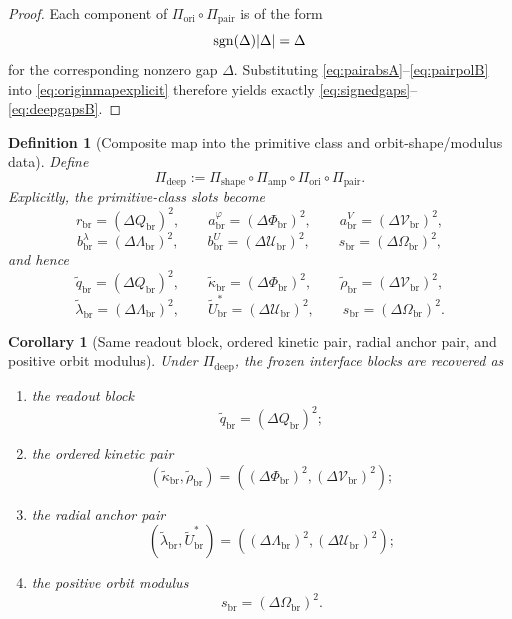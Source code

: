 \documentclass[11pt]{article}
\newcommand{\RespShapeReadout}{\widetilde q_{\mathrm{br}}}
\newcommand{\RespShapeCov}{\widetilde\kappa_{\mathrm{br}}}
\newcommand{\RespShapeRelax}{\widetilde\rho_{\mathrm{br}}}
\newcommand{\RespShapeWell}{\widetilde\lambda_{\mathrm{br}}}
\newcommand{\RespShapeEq}{\widetilde U_{\mathrm{br}}^{\ast}}
\newcommand{\ScaleMod}{s_{\mathrm{br}}}
\newcommand{\PrimRead}{r_{\mathrm{br}}}
\newcommand{\PrimCovSlot}{a_{\mathrm{br}}^{\varphi}}
\newcommand{\PrimRelaxSlot}{a_{\mathrm{br}}^{V}}
\newcommand{\PrimWellSlot}{b_{\mathrm{br}}^{\lambda}}
\newcommand{\PrimEqSlot}{b_{\mathrm{br}}^{U}}
\newcommand{\AmpMap}{\Pi_{\mathrm{amp}}}
\newcommand{\PrimMap}{\Pi_{\mathrm{shape}}}
\newcommand{\OriginMap}{\Pi_{\mathrm{ori}}}
\newcommand{\DeepMap}{\Pi_{\mathrm{deep}}}
\newcommand{\PairMap}{\Pi_{\mathrm{pair}}}
\newcommand{\GapRead}{\Delta Q_{\mathrm{br}}}
\newcommand{\GapCov}{\Delta \Phi_{\mathrm{br}}}
\newcommand{\GapRelax}{\Delta \mathcal V_{\mathrm{br}}}
\newcommand{\GapWell}{\Delta \Lambda_{\mathrm{br}}}
\newcommand{\GapEq}{\Delta \mathcal U_{\mathrm{br}}}
\newcommand{\GapScale}{\Delta \Omega_{\mathrm{br}}}
\newtheorem{definition}{Definition}
\newtheorem{corollary}{Corollary}
\begin{document}
\begin{proof}
Each component of \(\OriginMap\circ\PairMap\) is of the form
\[
\operatorname{sgn}(\Delta)\abs{\Delta}=\Delta
\]
for the corresponding nonzero gap \(\Delta\). Substituting \eqref{eq:pairabsA}--\eqref{eq:pairpolB} into \eqref{eq:originmapexplicit} therefore yields exactly \eqref{eq:signedgaps}--\eqref{eq:deepgapsB}.
\end{proof}

\begin{definition}[Composite map into the primitive class and orbit-shape/modulus data]
\label{def:deepmap}
Define
\begin{equation}
\DeepMap
:=
\PrimMap\circ\AmpMap\circ\OriginMap\circ\PairMap.
\label{eq:deepmap}
\end{equation}
Explicitly, the primitive-class slots become
\begin{equation}
\PrimRead=(\GapRead)^{2},
\qquad
\PrimCovSlot=(\GapCov)^{2},
\qquad
\PrimRelaxSlot=(\GapRelax)^{2},
\label{eq:primgapsA}
\end{equation}
\begin{equation}
\PrimWellSlot=(\GapWell)^{2},
\qquad
\PrimEqSlot=(\GapEq)^{2},
\qquad
\ScaleMod=(\GapScale)^{2},
\label{eq:primgapsB}
\end{equation}
and hence
\begin{equation}
\RespShapeReadout=(\GapRead)^{2},
\qquad
\RespShapeCov=(\GapCov)^{2},
\qquad
\RespShapeRelax=(\GapRelax)^{2},
\label{eq:shapegapsA}
\end{equation}
\begin{equation}
\RespShapeWell=(\GapWell)^{2},
\qquad
\RespShapeEq=(\GapEq)^{2},
\qquad
\ScaleMod=(\GapScale)^{2}.
\label{eq:shapegapsB}
\end{equation}
\end{definition}

\begin{corollary}[Same readout block, ordered kinetic pair, radial anchor pair, and positive orbit modulus]
\label{cor:blockmap}
Under \(\DeepMap\), the frozen interface blocks are recovered as
\begin{enumerate}
    \item the readout block
    \[
    \RespShapeReadout=(\GapRead)^{2};
    \]
    \item the ordered kinetic pair
    \[
    (\RespShapeCov,\RespShapeRelax)=((\GapCov)^{2},(\GapRelax)^{2});
    \]
    \item the radial anchor pair
    \[
    (\RespShapeWell,\RespShapeEq)=((\GapWell)^{2},(\GapEq)^{2});
    \]
    \item the positive orbit modulus
    \[
    \ScaleMod=(\GapScale)^{2}.
    \]
\end{enumerate}
\end{corollary}
\end{document}
